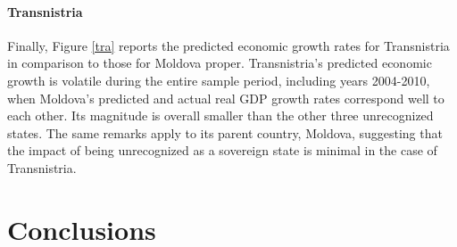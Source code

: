 \documentclass[12pt,a4paper]{article}%
\begin{document}
\paragraph{Transnistria}
Finally, Figure \ref{tra} reports the predicted economic growth rates for Transnistria in comparison to those for Moldova proper. 
Transnistria's predicted economic growth is volatile during the entire sample period, including years 2004-2010, when Moldova's predicted and actual real GDP growth rates correspond well to each other. 
Its magnitude is overall smaller than the other three unrecognized states.
The same remarks apply to its parent country, Moldova, suggesting that the impact of being unrecognized as a sovereign state is minimal in the case of Transnistria.

\section{Conclusions}
\end{document}
